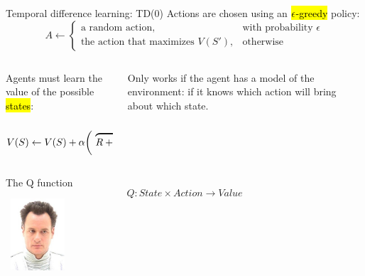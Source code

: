 \documentclass[aspectratio=169]{beamer}
\makeatletter
\newcommand\lbl[1]{\text{\footnotesize\begin{tabular}{@{}c@{}}#1\end{tabular}}}
\makeatother
\begin{document}
\begin{frame}{Temporal difference learning: TD(0)}
  \large Actions are chosen using an \hl{${\boldmath\Large\epsilon}$-greedy} policy:
  \begin{equation*}
    A \gets
    \begin{cases}
      \textrm{a random action},                 & \textrm{with probability } \epsilon\\
      \textrm{the action that maximizes }V(S'), & \textrm{otherwise}
    \end{cases}
  \end{equation*}
  \begin{columns}
    \begin{column}{0.65\textwidth}
      Agents must learn the value of the possible \hl{states}:
      \begin{equation*}
        V(S) \gets V(S) + \alpha\bigg(\,\overbrace{R + \gamma V(S') - V(S)}^{\lbl{TD error}}\,\bigg)
      \end{equation*}
    \end{column}
    \pause
    \begin{column}{0.3\textwidth}
      \begin{tcolorbox}[title=Constraint, left=1mm, right=1mm, halign=flush left]
         Only works if the agent has a model of the environment:
         if it knows which action will bring about which state.
      \end{tcolorbox}
    \end{column}
  \end{columns}
\end{frame}

\begin{frame}{The Q function}
  \Huge
  \begin{equation*}
    Q: State \times Action \to Value
  \end{equation*}
  \vfill~\includegraphics[width=0.15\textwidth]{q.jpg}
\end{frame}
\end{document}
